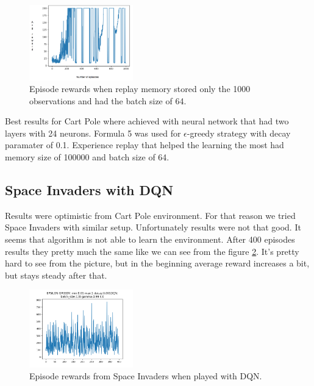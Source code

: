 \begin{figure}[H]
    \centering
    \includegraphics[width=0.4\textwidth]{images/experience_replay.png}
    \caption{
    Episode rewards when replay memory stored only the 1000 observations and had the batch size of 64.
    }
    \label{fig:experience_replay}
\end{figure}

Best results for Cart Pole where achieved with neural network that had two layers with 24 neurons. Formula 5 was used for $\epsilon$-greedy strategy with decay paramater of 0.1. Experience replay that helped the learning the most had memory size of 100000 and batch size of 64.

\subsection{Space Invaders with DQN}
Results were optimistic from Cart Pole environment. For that reason we tried Space Invaders with similar setup. Unfortunately results were not that good. It seems that algorithm is not able to learn the environment. After 400 episodes results they pretty much the same like we can see from the figure \ref{fig:figure_space}. It's pretty hard to see from the picture, but in the beginning average reward increases a bit, but stays steady after that.

\begin{figure}[H]
    \centering
    \includegraphics[width=0.4\textwidth]{images/figure_space.png}
    \caption{
    Episode rewards from Space Invaders when played with DQN.
    }
    \label{fig:figure_space}
\end{figure}
